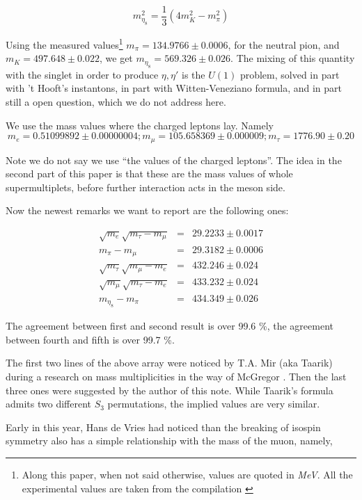 \documentclass[a4paper,10pt]{article}
\begin{document}
$$
m_{\eta_8}^2 = \frac 13 (4 m_K^2-m_\pi^2)
$$

Using the measured values\footnote{Along this paper, when not said otherwise, values are quoted in \textit{MeV}. All the experimental values are taken from the compilation \cite{pdg}} $m_\pi=134.9766 \pm 0.0006$, for the neutral pion, and $m_K=497.648 \pm 0.022$, we get $m_{\eta_8}=569.326 \pm 0.026$. 
The mixing of this quantity with the singlet in order to produce $\eta, \eta'$ is the $U(1)$ problem, solved in part with 't Hooft's instantons, in part with Witten-Veneziano formula, and in part still a open question, which we do not address here.

We use the mass values where the charged leptons lay. Namely
$$
m_e=0.51099892 \pm 0.00000004; m_\mu=105.658369 \pm 0.000009;
m_\tau=1776.90 \pm 0.20  
$$

Note we do not say we use ``the values of the charged leptons''. The idea in the second part of this paper is that these are the mass values of whole supermultiplets, before further interaction acts in the meson side.

Now the newest remarks we want to report are the following ones:

\begin{eqnarray*}
  \sqrt{m_e}\sqrt{m_\tau-m_\mu}&=& 29.2233 \pm 0.0017 \\
  m_\pi-m_\mu&=&  29.3182 \pm 0.0006 \\
  \sqrt{m_\tau}\sqrt{m_\mu-m_e}&=&  432.246 \pm 0.024 \\
  \sqrt{m_\mu}\sqrt{m_\tau-m_e}&=&  433.232 \pm 0.024 \\
  m_{\eta_8}-m_\pi&=& 434.349 \pm 0.026 
\end{eqnarray*} 

The agreement between first and second result is over 99.6 \%, the agreement between fourth and fifth is over 99.7 \%.

The first two lines of the above array were noticed by T.A. Mir (aka Taarik) during a research on mass multiplicities \cite{Shah:2007gw} in the way of McGregor \cite{Mac Gregor:1980jua}. Then the last three ones were suggested by the author of this note. While Taarik's formula admits two different $S_3$ permutations, the implied values are very similar.

Early in this year, Hans de Vries had noticed than the breaking of isospin symmetry also has a simple relationship with the mass of the muon, namely,
\end{document}
